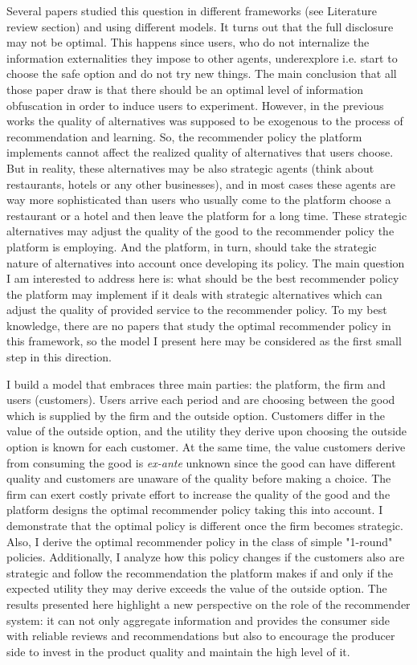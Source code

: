 \documentclass[a4paper]{article}
\begin{document}
	
	Several papers studied this question in different frameworks (see Literature review section) and using different models. It turns out that the full disclosure may not be optimal. This happens since users, who do not internalize the information externalities they impose to other agents, underexplore i.e. start to choose the safe option and do not try new things. The main conclusion that all those paper draw is that there should be an optimal level of information obfuscation in order to induce users to experiment. However, in the previous works the quality of alternatives was supposed to be exogenous to the process of recommendation and learning. So, the recommender policy the platform implements cannot affect the realized quality of alternatives that users choose. But in reality, these alternatives may be also strategic agents (think about restaurants, hotels or any other businesses), and in most cases these agents are way more sophisticated than users who usually come to the platform choose a restaurant or a hotel and then leave the platform for a long time. These strategic alternatives may adjust the quality of the good to the recommender policy the platform is employing. And the platform, in turn, should take the strategic nature of alternatives into account once developing its policy. The main question I am interested to address here is: what should be the best recommender policy the platform may implement if it deals with strategic alternatives which can adjust the quality of provided service to the recommender policy. To my best knowledge, there are no papers that study the optimal recommender policy in this framework, so the model I present here may be considered as the first small step in this direction.
	
	
	
	
	I build a model that embraces three main parties: the platform, the firm and users (customers). Users arrive each period and are choosing between the good which is supplied by the firm and the outside option. Customers differ in the value of the outside option, and the utility they derive upon choosing the outside option is known for each customer. At the same time, the value customers derive from consuming the good is \textit{ex-ante} unknown since the good can have different quality and customers are unaware of the quality before making a choice. The firm can exert costly private effort to increase the quality of the good and the platform designs the optimal recommender policy taking this into account. I demonstrate that the optimal policy is different once the firm becomes strategic. Also, I derive the optimal recommender policy in the class of simple "1-round" policies. Additionally, I analyze how this policy changes if the customers also are strategic and follow the recommendation the platform makes if and only if the expected utility they may derive exceeds the value of the outside option. The results presented here highlight a new perspective on the role of the recommender system: it can not only aggregate information and provides the consumer side with reliable reviews and recommendations but also to encourage the producer side to invest in the product quality and maintain the high level of it.
	
\end{document}
